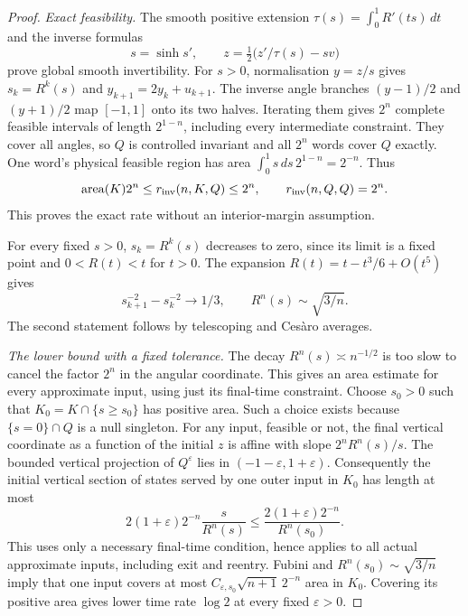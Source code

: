 \documentclass[11pt]{amsart}
\theoremstyle{definition}
\theoremstyle{remark}
\newcommand{\area}{\operatorname{area}}
\numberwithin{equation}{section}
\begin{document}
\begin{proof}
\emph{Exact feasibility.}
The smooth positive extension
$\tau(s)=\int_0^1R'(ts)\,dt$ and the inverse formulas
\[
s=\sinh s',\qquad z=\tfrac12\bigl(z'/\tau(s)-sv\bigr)
\]
prove global smooth invertibility. For $s>0$, normalisation
$y=z/s$ gives $s_k=R^k(s)$ and $y_{k+1}=2y_k+u_{k+1}$.
The inverse angle branches $(y-1)/2$ and $(y+1)/2$ map
$[-1,1]$ onto its two halves. Iterating them gives $2^n$
complete feasible intervals of length $2^{1-n}$, including
every intermediate constraint. They cover all angles, so $Q$
is controlled invariant and all $2^n$ words cover $Q$ exactly.
One word's physical feasible region has area
$\int_0^1s\,ds\,2^{1-n}=2^{-n}$. Thus
\[
\area(K)2^n\le r_{\rm inv}(n,K,Q)\le2^n,
\qquad r_{\rm inv}(n,Q,Q)=2^n.
\]
This proves the exact rate without an interior-margin assumption.

For every fixed $s>0$, $s_k=R^k(s)$ decreases to zero, since
its limit is a fixed point and $0<R(t)<t$ for $t>0$.
The expansion $R(t)=t-t^3/6+O(t^5)$ gives
\[
s_{k+1}^{-2}-s_k^{-2}\longrightarrow1/3,
\qquad R^n(s)\sim\sqrt{3/n}.
\]
The second statement follows by telescoping and Ces\`aro averages.

\smallskip
\emph{The lower bound with a fixed tolerance.}
The decay $R^n(s)\asymp n^{-1/2}$ is too slow to cancel the
factor $2^n$ in the angular coordinate. This gives an area estimate
for every approximate input, using just its final-time constraint. Choose $s_0>0$ such that
$K_0=K\cap\{s\ge s_0\}$ has
positive area. Such a choice exists because $\{s=0\}\cap Q$
is a null singleton. For any input, feasible or not, the final
vertical coordinate as a function of the initial $z$ is affine
with slope $2^nR^n(s)/s$. The bounded vertical projection
of $Q^\varepsilon$ lies in $(-1-\varepsilon,1+\varepsilon)$.
Consequently the initial vertical section of states served by one
outer input in $K_0$ has length at most
\[
2(1+\varepsilon)2^{-n}\frac{s}{R^n(s)}
 \le\frac{2(1+\varepsilon)2^{-n}}{R^n(s_0)}.
\]
This uses only a necessary final-time condition, hence applies to
all actual approximate inputs, including exit and reentry.
Fubini and $R^n(s_0)\sim\sqrt{3/n}$ imply that one input
covers at most $C_{\varepsilon,s_0}\sqrt{n+1}\,2^{-n}$
area in $K_0$. Covering its positive area gives lower time rate
$\log2$ at every fixed $\varepsilon>0$.


\end{proof}
\end{document}
